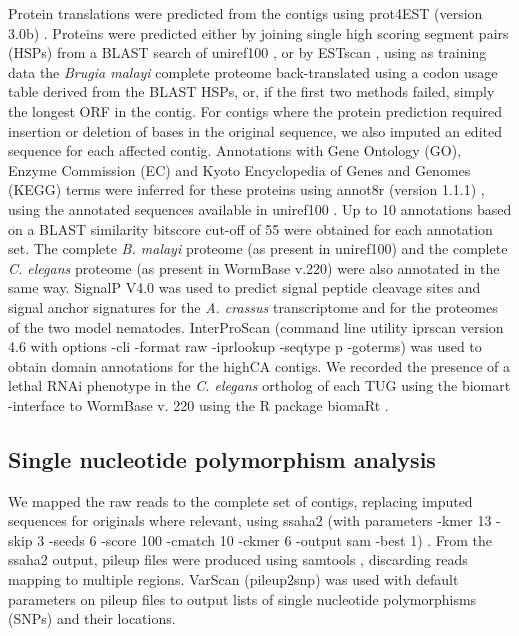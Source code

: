 \documentclass[10pt]{bmc_article}
\newenvironment{bmcformat}{\begin{raggedright}\baselineskip20pt\sloppy\setboolean{publ}{false}}{\end{raggedright}\baselineskip20pt\sloppy}
\begin{document}
\begin{bmcformat}
Protein translations were predicted from the contigs using prot4EST
(version 3.0b) \cite{wasmuth_prot4est:_2004}. Proteins were predicted
either by joining single high scoring segment pairs (HSPs) from a
BLAST search of uniref100 \cite{pmid18836194}, or by ESTscan
\cite{estscan}, using as training data the \textit{Brugia malayi}
complete proteome \cite{ghedin_draft_2007} back-translated using a
codon usage table derived from the BLAST HSPs, or, if the first two
methods failed, simply the longest ORF in the contig. For contigs
where the protein prediction required insertion or deletion of bases
in the original sequence, we also imputed an edited sequence for each
affected contig. Annotations with Gene Ontology (GO), Enzyme
Commission (EC) and Kyoto Encyclopedia of Genes and Genomes (KEGG)
terms were inferred for these proteins using annot8r (version 1.1.1)
\cite{schmid_annot8r:_2008}, using the annotated sequences available
in uniref100 \cite{pmid18836194}. Up to 10 annotations based on a
BLAST similarity bitscore cut-off of 55 were obtained for each
annotation set. The complete \textit{B. malayi} proteome (as present
in uniref100) and the complete \textit{C. elegans} proteome (as
present in WormBase v.220) were also annotated in the same
way. SignalP V4.0 \cite{pmid21959131} was used to predict signal
peptide cleavage sites and signal anchor signatures for the
\textit{A. crassus} transcriptome and for the proteomes of the two
model nematodes. InterProScan \cite{pmid11590104} (command line
utility iprscan version 4.6 with options -cli -format raw -iprlookup
-seqtype p -goterms) was used to obtain domain annotations for the
highCA contigs. We recorded the presence of a lethal RNAi phenotype in
the \textit{C. elegans} ortholog of each TUG using the biomart
-interface \cite{pmid22083790} to WormBase v. 220 using the R package
biomaRt \cite{pmid19617889}.

\subsection*{Single nucleotide polymorphism analysis}

We mapped the raw reads to the complete set of contigs, replacing
imputed sequences for originals where relevant, using ssaha2 (with
parameters -kmer 13 -skip 3 -seeds 6 -score 100 -cmatch 10 -ckmer 6
-output sam -best 1) \cite{pmid11591649}. From the ssaha2 output,
pileup files were produced using samtools
\cite{journals/bioinformatics/LiHWFRHMAD09}, discarding reads mapping
to multiple regions. VarScan \cite{pmid19542151} (pileup2snp) was used
with default parameters on pileup files to output lists of single
nucleotide polymorphisms (SNPs) and their locations.



\end{bmcformat}
\end{document}
